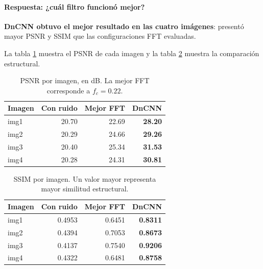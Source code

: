 \documentclass[11pt]{article}
\begin{document}
\paragraph{Respuesta: ¿cuál filtro funcionó mejor?}

\textbf{DnCNN obtuvo el mejor resultado en las cuatro
imágenes}: presentó mayor PSNR y SSIM que las configuraciones
FFT evaluadas.

La tabla \ref{tab:cnn-psnr} muestra el PSNR de cada imagen
y la tabla \ref{tab:cnn-ssim} muestra la comparación
estructural.

\begin{table}[H]
\centering

\caption{
    PSNR por imagen, en dB.
    La mejor FFT corresponde a $f_c=0.22$.
}
\label{tab:cnn-psnr}

\begin{tabular}{lrrr}
\hline
\rowcolor{pastelblue}
Imagen & Con ruido & Mejor FFT & DnCNN\\
\hline
img1 & 20.70 & 22.69 & \textbf{28.20}\\
img2 & 20.29 & 24.66 & \textbf{29.26}\\
img3 & 20.40 & 25.34 & \textbf{31.53}\\
img4 & 20.28 & 24.31 & \textbf{30.81}\\
\hline
\end{tabular}
\end{table}

\begin{table}[H]
\centering

\caption{
    SSIM por imagen. Un valor mayor representa mayor
    similitud estructural.
}
\label{tab:cnn-ssim}

\begin{tabular}{lrrr}
\hline
\rowcolor{pastelblue}
Imagen & Con ruido & Mejor FFT & DnCNN\\
\hline
img1 & 0.4953 & 0.6451 & \textbf{0.8311}\\
img2 & 0.4394 & 0.7053 & \textbf{0.8673}\\
img3 & 0.4137 & 0.7540 & \textbf{0.9206}\\
img4 & 0.4322 & 0.6481 & \textbf{0.8758}\\
\hline
\end{tabular}
\end{table}
\end{document}
